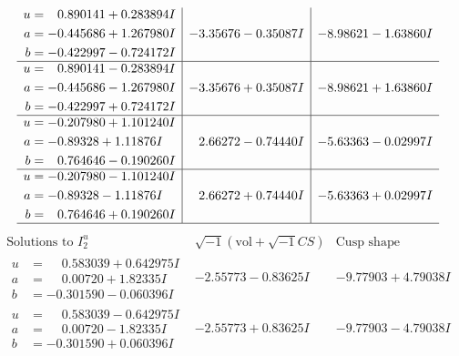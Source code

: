 \documentclass[1p]{elsarticle_modified}
\theoremstyle{definition}
\newcommand{\I}{\sqrt{-1}}
\begin{document}
$$\begin{array}{c|c|c}
\begin{aligned}
u &= \phantom{-}0.890141 + 0.283894 I \\
a &= -0.445686 + 1.267980 I \\
b &= -0.422997 - 0.724172 I\end{aligned}
 & -3.35676 - 0.35087 I & -8.98621 - 1.63860 I \\ \hline\begin{aligned}
u &= \phantom{-}0.890141 - 0.283894 I \\
a &= -0.445686 - 1.267980 I \\
b &= -0.422997 + 0.724172 I\end{aligned}
 & -3.35676 + 0.35087 I & -8.98621 + 1.63860 I \\ \hline\begin{aligned}
u &= -0.207980 + 1.101240 I \\
a &= -0.89328 + 1.11876 I \\
b &= \phantom{-}0.764646 - 0.190260 I\end{aligned}
 & \phantom{-}2.66272 - 0.74440 I & -5.63363 - 0.02997 I \\ \hline\begin{aligned}
u &= -0.207980 - 1.101240 I \\
a &= -0.89328 - 1.11876 I \\
b &= \phantom{-}0.764646 + 0.190260 I\end{aligned}
 & \phantom{-}2.66272 + 0.74440 I & -5.63363 + 0.02997 I\\
 \hline 
 \end{array}$$\newpage$$\begin{array}{c|c|c}  
\text{Solutions to }I^u_{2}& \I (\text{vol} + \sqrt{-1}CS) & \text{Cusp shape}\\
 \hline 
\begin{aligned}
u &= \phantom{-}0.583039 + 0.642975 I \\
a &= \phantom{-}0.00720 + 1.82335 I \\
b &= -0.301590 - 0.060396 I\end{aligned}
 & -2.55773 - 0.83625 I & -9.77903 + 4.79038 I \\ \hline\begin{aligned}
u &= \phantom{-}0.583039 - 0.642975 I \\
a &= \phantom{-}0.00720 - 1.82335 I \\
b &= -0.301590 + 0.060396 I\end{aligned}
 & -2.55773 + 0.83625 I & -9.77903 - 4.79038 I \\ \hline\begin{aligned}

\end{aligned}
\end{array}$$
\end{document}

